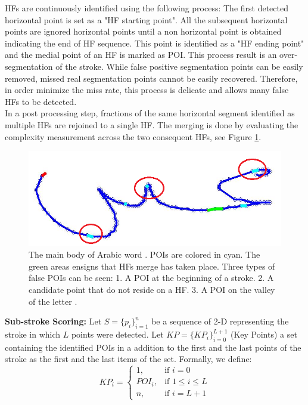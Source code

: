 \documentclass[journal,compsoc]{IEEEtran}
\begin{document}
HFs are continuously identified using the following process: The first detected horizontal point is set as a "HF starting point". All the subsequent horizontal points are ignored horizontal points until a non horizontal point is obtained indicating the end of HF sequence. This point is identified as a "HF ending point" and the medial point of an HF is marked as POI. This process result is an over-segmentation of the stroke. While false positive segmentation points can be easily removed, missed real segmentation points cannot be easily recovered. Therefore, in order minimize the miss rate, this process is delicate and allows many false HFs to be detected.\\

In a post processing step, fractions of the same horizontal segment identified as multiple HFs are rejoined to a single HF. The merging is done by evaluating the complexity measurement across the two consequent HFs, see Figure \ref{fig:candidate_in_no_horizontal}.\\

\begin{figure}
\centering
\includegraphics[width=0.5\columnwidth]{./figures/candidate_in_no_horizontal}
\caption{The main body of Arabic word . POIs are colored in cyan. The green areas ensigns that HFs merge has taken place. Three types of false POIs can be seen: 1. A POI at the beginning of a stroke. 2. A candidate point that do not reside on a HF. 3. A POI on the valley of the letter . }
\label{fig:candidate_in_no_horizontal}
\end{figure}

\textbf{Sub-stroke Scoring:}
Let $S=\{p_{i}\}_{i=1}^{n}$ be a sequence of 2-D representing the stroke in which $L$ points were detected. Let $KP=\{KP_{i}\}_{i=0}^{L+1}$ (Key Points) a set containing the identified POIs in a addition to the first and the last points of the stroke as the first and the last items of the set.
Formally, we define: 
\begin{equation}
KP_{i} =\begin{cases}    1		, & \mbox{if } i=0 \\
							   POI_{i}	, & \mbox{if } 1\leq i \leq L \\
							   n    , & \mbox{if } i=L+1 
			\end{cases}				
\end{equation}
\end{document}

